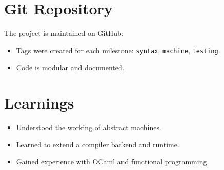 \documentclass[11pt]{article}
\begin{document}
\section{Git Repository}
The project is maintained on GitHub:
\begin{itemize}
    \item Tags were created for each milestone: \texttt{syntax}, \texttt{machine}, \texttt{testing}.
    \item Code is modular and documented.
\end{itemize}

\section{Learnings}
\begin{itemize}
    \item Understood the working of abstract machines.
    \item Learned to extend a compiler backend and runtime.
    \item Gained experience with OCaml and functional programming.
\end{itemize}
\end{document}
